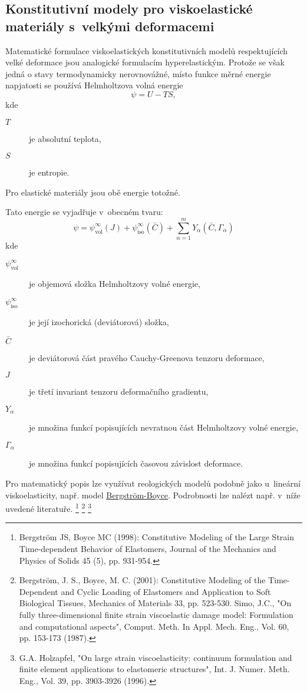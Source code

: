 
\subsection{Konstitutivní modely pro viskoelastické materiály s~velkými deformacemi}
Matematické formulace viskoelastických konstitutivních modelů respektujících velké deformace jsou analogické formulacím hyperelastickým. Protože se však jedná o stavy termodynamicky nerovnovážné, místo funkce měrné energie napjatosti se používá Helmholtzova volná energie
\begin{equation}
	\psi = U - TS,
\end{equation}
kde
\begin{description}
	\item[$T$] je absolutní teplota,
	\item[$S$] je entropie.
\end{description}
Pro elastické materiály jsou obě energie totožné.

Tato energie se vyjadřuje v~obecném tvaru:%
\begin{equation}
	\psi = \psi_\text{vol}^\infty(J) + \psi_\text{iso}^\infty(\bar{C}) + \sum\limits_{\alpha=1}^m Y_\alpha(\bar{C}, \Gamma_\alpha)
\end{equation}
kde
\begin{description}
	\item[$\psi_\text{vol}^\infty$] je objemová složka Helmholtzovy volné energie,
	\item[$\psi_\text{iso}^\infty$] je její izochorická (deviátorová) složka,
	\item[$\bar{C}$] je deviátorová část pravého Cauchy-Greenova tenzoru deformace,
	\item[$J$] je třetí invariant tenzoru deformačního gradientu,
	\item[$Y_\alpha$] je množina funkcí popisujících nevratnou část Helmholtzovy volné energie,
	\item[$\Gamma_\alpha$] je množina funkcí popisujících časovou závislost deformace.
\end{description}

Pro matematický popis lze využívat reologických modelů podobně jako u~lineární viskoelasticity, např. model \hyperref[sec:bergstrom-boyce]{Bergström-Boyce}. Podrobnosti lze nalézt např. v~níže uvedené literatuře.
\footnote{Bergström JS, Boyce MC (1998):  Constitutive Modeling of the Large Strain Time-dependent Behavior of Elastomers, Journal of the Mechanics and Physics of Solids 45 (5), pp. 931-954.}
\footnote{Bergström, J. S., Boyce, M. C. (2001): Constitutive Modeling of the Time-Dependent and Cyclic Loading of Elastomers and Application to Soft Biological Tissues, Mechanics of Materials 33, pp. 523-530.
Simo, J.C., "On fully three-dimensional finite strain viscoelastic damage model: Formulation and computational aspects", Comput. Meth. In Appl. Mech. Eng., Vol. 60, pp. 153-173 (1987).}
\footnote{G.A. Holzapfel, "On large strain viscoelasticity: continuum formulation and finite element applications to elastomeric structures", Int. J. Numer. Meth. Eng., Vol. 39, pp. 3903-3926 (1996).}
